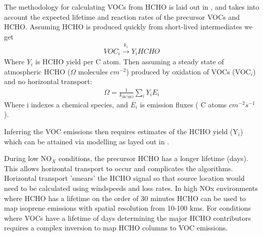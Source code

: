 The methodology for calculating VOCs from HCHO is laid out in \citet{Palmer_2003}, and takes into account the expected lifetime and reaction rates of the precursor VOCs and HCHO.
Assuming HCHO is produced quickly from short-lived intermediates we get
\begin{eqnarray*}
VOC_i \overset{k_i}{\rightarrow} Y_i HCHO
\end{eqnarray*}
Where $Y_i$ is HCHO yield per C atom.
Then assuming a steady state of atmospheric HCHO ($\Omega$ molecules $cm^{-2}$) produced by oxidation of VOCs (VOC$_i$) and no horizontal transport:
\begin{eqnarray*}
\Omega = \frac{1}{k_{HCHO}} \sum_{i} Y_i E_i
\end{eqnarray*}
Where i indexes a chemical species, and $E_i$ is emission fluxes ( C atoms $cm^{-2}s^{-1}$).

Inferring the VOC emissions then requires estimates of the HCHO yield (Y$_i$) which can be attained via modelling as layed out in \citet{Millet_2006}.

During low NO$_X$ conditions, the precursor HCHO has a longer lifetime (days).
This allows horizontal transport to occur and complicates the algorithms.
Horizontal transport 'smears' the HCHO signal so that source location would need to be calculated using windspeeds and loss rates.
In high NOx environments where HCHO has a lifetime on the order of 30 minutes HCHO can be used to map isoprene emissions with spatial resolution from 10-100 kms.
For conditions where VOCs have a lifetime of days determining the major HCHO contributors requires a complex inversion to map HCHO columns to VOC emissions.
